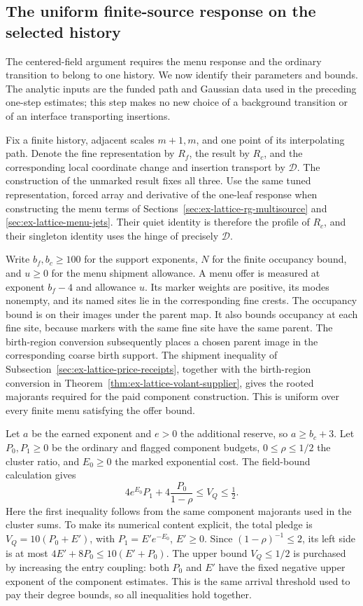 \subsection{The uniform finite-source response on the selected history}
\label{sec:finite-menu-history-handoff}
The centered-field argument requires the menu response and the ordinary
transition to belong to one history. We now identify their parameters and
bounds. The analytic inputs are the funded path and Gaussian data used in
the preceding one-step estimates; this step makes no new choice of a
background transition or of an interface transporting insertions.

Fix a finite history, adjacent scales $m+1,m$, and one point of its
interpolating path. Denote the fine representation by $R_f$, the result
by $R_c$, and the corresponding local coordinate change and insertion
transport by $\mathcal D$. The construction of the unmarked result fixes
all three. Use the same tuned representation, forced array and derivative
of the one-leaf response when constructing the menu terms of
Sections~\ref{sec:ex-lattice-rg-multisource} and
\ref{sec:ex-lattice-menu-jets}. Their quiet identity is therefore the
profile of $R_c$, and their singleton identity uses the hinge of precisely
$\mathcal D$.

Write $b_f,b_c\ge100$ for the support exponents, $N$ for the finite
occupancy bound, and $u\ge0$ for the menu shipment allowance. A menu offer
is measured at exponent $b_f-4$ and allowance $u$. Its marker weights are
positive, its modes nonempty, and its named sites lie in the corresponding
fine crests. The occupancy bound is on their images under the parent map. It also bounds
occupancy at each fine site, because markers with the same fine site have
the same parent. The birth-region conversion subsequently places a chosen parent image in
the corresponding coarse birth support. The shipment inequality of
Subsection~\ref{sec:ex-lattice-price-receipts}, together with the birth-region
conversion in Theorem~\ref{thm:ex-lattice-volant-supplier}, gives the
rooted majorants required for the paid component construction. This is
uniform over every finite menu satisfying the offer bound.

Let $a$ be the earned exponent and $e>0$ the additional reserve, so
$a\ge b_c+3$. Let $P_0,P_1\ge0$ be the ordinary and flagged component
budgets, $0\le\rho\le1/2$ the cluster ratio, and $E_0\ge0$ the marked
exponential cost. The field-bound calculation gives
\begin{equation}\label{eq:menu-total-pledge}
 4e^{E_0}P_1+4\frac{P_0}{1-\rho}\le V_Q\le\tfrac12.
\end{equation}
Here the first inequality follows from the same component majorants used
in the cluster sums. To make its numerical content explicit, the total
pledge is $V_Q=10(P_0+E')$, with $P_1=E'e^{-E_0}$, $E'\ge0$.
Since $(1-\rho)^{-1}\le2$, its left side is at most
$4E'+8P_0\le10(E'+P_0)$. The upper bound $V_Q\le1/2$ is purchased
by increasing the entry coupling: both $P_0$ and $E'$ have the fixed
negative upper exponent of the component estimates. This is the same
arrival threshold used to pay their degree bounds, so all inequalities
hold together.


